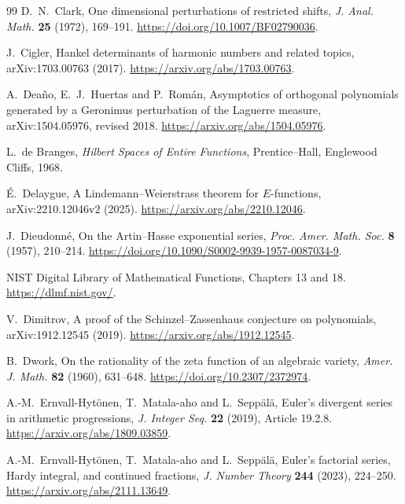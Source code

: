 \documentclass[11pt]{article}
\theoremstyle{definition}
\theoremstyle{remark}
\begin{document}
\begin{thebibliography}{99}
D.~N.~Clark,
\newblock One dimensional perturbations of restricted shifts,
\newblock \emph{J. Anal. Math.} \textbf{25} (1972), 169--191.
\newblock \url{https://doi.org/10.1007/BF02790036}.

J.~Cigler,
\newblock Hankel determinants of harmonic numbers and related topics,
\newblock arXiv:1703.00763 (2017).
\newblock \url{https://arxiv.org/abs/1703.00763}.

A.~Dea\~no, E.~J.~Huertas and P.~Rom\'an,
\newblock Asymptotics of orthogonal polynomials generated by a Geronimus
perturbation of the Laguerre measure,
\newblock arXiv:1504.05976, revised 2018.
\newblock \url{https://arxiv.org/abs/1504.05976}.

L.~de Branges,
\newblock \emph{Hilbert Spaces of Entire Functions},
\newblock Prentice--Hall, Englewood Cliffs, 1968.

\'E.~Delaygue,
\newblock A Lindemann--Weierstrass theorem for $E$-functions,
\newblock arXiv:2210.12046v2 (2025).
\newblock \url{https://arxiv.org/abs/2210.12046}.

J.~Dieudonn\'e,
\newblock On the Artin--Hasse exponential series,
\newblock \emph{Proc. Amer. Math. Soc.} \textbf{8} (1957), 210--214.
\newblock \url{https://doi.org/10.1090/S0002-9939-1957-0087034-9}.

NIST Digital Library of Mathematical Functions,
\newblock Chapters 13 and 18.
\newblock \url{https://dlmf.nist.gov/}.

V.~Dimitrov,
\newblock A proof of the Schinzel--Zassenhaus conjecture on polynomials,
\newblock arXiv:1912.12545 (2019).
\newblock \url{https://arxiv.org/abs/1912.12545}.

B.~Dwork,
\newblock On the rationality of the zeta function of an algebraic variety,
\newblock \emph{Amer. J. Math.} \textbf{82} (1960), 631--648.
\newblock \url{https://doi.org/10.2307/2372974}.

A.-M.~Ernvall-Hyt\"onen, T.~Matala-aho and L.~Sepp\"al\"a,
\newblock Euler's divergent series in arithmetic progressions,
\newblock \emph{J. Integer Seq.} \textbf{22} (2019), Article 19.2.8.
\newblock \url{https://arxiv.org/abs/1809.03859}.

A.-M.~Ernvall-Hyt\"onen, T.~Matala-aho and L.~Sepp\"al\"a,
\newblock Euler's factorial series, Hardy integral, and continued fractions,
\newblock \emph{J. Number Theory} \textbf{244} (2023), 224--250.
\newblock \url{https://arxiv.org/abs/2111.13649}.


\end{thebibliography}
\end{document}
